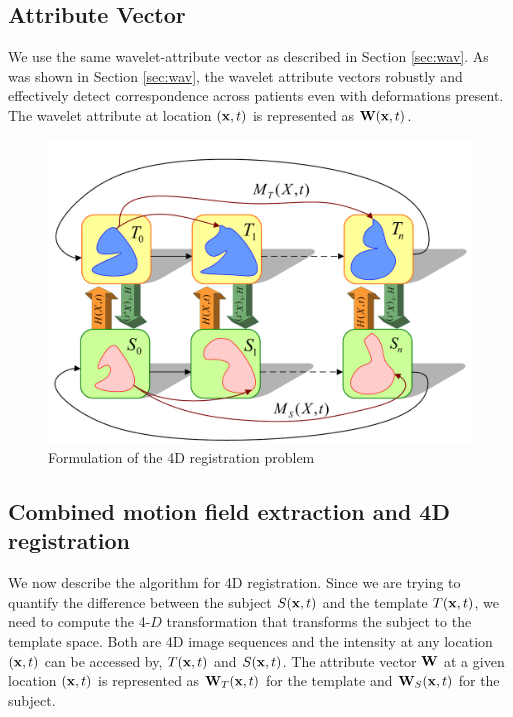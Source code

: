 \subsection{Attribute Vector}

We use the same wavelet-attribute vector as described in Section \ref{sec:wav}. As was shown in Section \ref{sec:wav}, the wavelet attribute vectors robustly and effectively detect correspondence across patients even with deformations present. The wavelet attribute at location $( \mathbf{x}, t )$ is represented as  $\mathbf{W}( \mathbf{x}, t )$. 

\begin{figure}
\begin{center}
\includegraphics[width=.9\textwidth]{images/4dreg} 
\caption{Formulation of the 4D registration problem}
\label{fig:reg4d}
\end{center}
\end{figure} 

\subsection{Combined motion field extraction and 4D registration}

We now describe the algorithm for 4D registration. Since we are trying to quantify the difference between the subject $S(\mathbf{x}, t)$ and the template $T(\mathbf{x}, t)$, we need to compute the 4-$D$ transformation that transforms the subject to the template space. Both are 4D image sequences and the intensity at any location  $( \mathbf{x}, t )$ can be accessed by, $T ( \mathbf{x}, t)$ and $S ( \mathbf{x}, t )$. The attribute vector $\mathbf{W}$ at a given location $( \mathbf{x}, t )$  is represented as $\mathbf{W}_T(\mathbf{x}, t)$ for the template and $\mathbf{W}_S(\mathbf{x}, t)$ for the subject.


